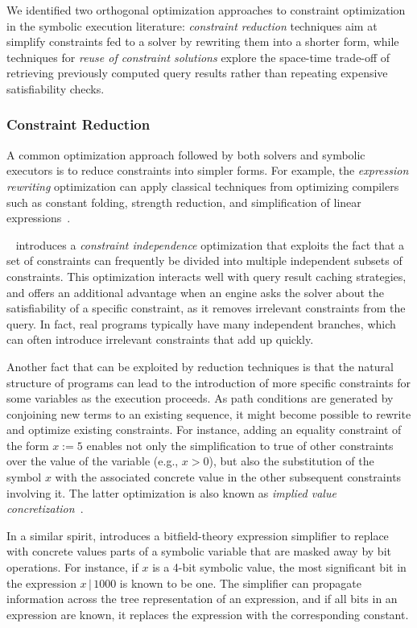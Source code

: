 We identified two orthogonal optimization approaches to constraint optimization in the symbolic execution literature: {\em constraint reduction} techniques aim at simplify constraints fed to a solver by rewriting them into a shorter form, while techniques for {\em reuse of constraint solutions} explore the space-time trade-off of retrieving previously computed query results rather than repeating expensive satisfiability checks.

\subsubsection{Constraint Reduction}
A common optimization approach followed by both solvers and symbolic executors is to reduce constraints into simpler forms. For example, the {\em expression rewriting} optimization can apply classical techniques from optimizing compilers such as constant folding, strength reduction, and simplification of linear expressions~\cite{KLEE-OSDI08}.

~\cite{EXE-CCS06} introduces a {\em constraint independence} optimization that exploits the fact that a set of constraints can frequently be divided into multiple independent subsets of constraints. This optimization interacts well with query result caching strategies, and offers an additional advantage when an engine asks the solver about the satisfiability of a specific constraint, as it removes irrelevant constraints from the query. In fact, real programs typically have many independent branches, which can often introduce irrelevant constraints that add up quickly.

Another fact that can be exploited by reduction techniques is that the natural structure of programs can lead to the introduction of more specific constraints for some variables as the execution proceeds. As path conditions are generated by conjoining new terms to an existing sequence, it might become possible to rewrite and optimize existing constraints. For instance, adding an equality constraint of the form $x:=5$ enables not only the simplification to true of other constraints over the value of the variable (e.g., $x>0$), but also the substitution of the symbol $x$ with the associated concrete value in the other subsequent constraints involving it. The latter optimization is also known as {\em implied value concretization}~\cite{KLEE-OSDI08}.

In a similar spirit, \cite{CKC-TOCS12} introduces a bitfield-theory expression simplifier to replace with concrete values parts of a symbolic variable that are masked away by bit operations. For instance, if $x$ is a 4-bit symbolic value, the most significant bit in the expression $x\,|\,1000$ is known to be one. The simplifier can propagate information across the tree representation of an expression, and if all bits in an expression are known, it replaces the expression with the corresponding constant.
 
